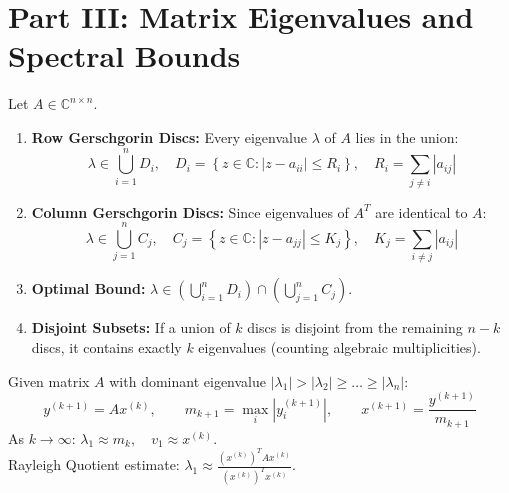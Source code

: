 \section{Part III: Matrix Eigenvalues and Spectral Bounds}

\begin{theorembox}
Let $A \in \mathbb{C}^{n \times n}$.
\begin{enumerate}[label=\textbf{\arabic*.},noitemsep]
    \item \textbf{Row Gerschgorin Discs:} Every eigenvalue $\lambda$ of $A$ lies in the union:
    \begin{equation}
        \boxed{\lambda \in \bigcup_{i=1}^n D_i, \quad D_i = \left\{ z \in \mathbb{C} : |z - a_{ii}| \le R_i \right\}, \quad R_i = \sum_{j \ne i} |a_{ij}|}
    \end{equation}
    \item \textbf{Column Gerschgorin Discs:} Since eigenvalues of $A^T$ are identical to $A$:
    \begin{equation}
        \boxed{\lambda \in \bigcup_{j=1}^n C_j, \quad C_j = \left\{ z \in \mathbb{C} : |z - a_{jj}| \le K_j \right\}, \quad K_j = \sum_{i \ne j} |a_{ij}|}
    \end{equation}
    \item \textbf{Optimal Bound:} $\lambda \in \left( \bigcup_{i=1}^n D_i \right) \cap \left( \bigcup_{j=1}^n C_j \right)$.
    \item \textbf{Disjoint Subsets:} If a union of $k$ discs is disjoint from the remaining $n - k$ discs, it contains exactly $k$ eigenvalues (counting algebraic multiplicities).
\end{enumerate}
\end{theorembox}

\begin{notebox}
Given matrix $A$ with dominant eigenvalue $|\lambda_1| > |\lambda_2| \ge \dots \ge |\lambda_n|$:
\begin{equation}
    y^{(k+1)} = A x^{(k)}, \qquad m_{k+1} = \max_i |y_i^{(k+1)}|, \qquad x^{(k+1)} = \frac{y^{(k+1)}}{m_{k+1}}
\end{equation}
As $k \to \infty$: $\boxed{\lambda_1 \approx m_k}, \quad \boxed{v_1 \approx x^{(k)}}$. \\
Rayleigh Quotient estimate: $\lambda_1 \approx \frac{(x^{(k)})^T A x^{(k)}}{(x^{(k)})^T x^{(k)}}$.
\end{notebox}

